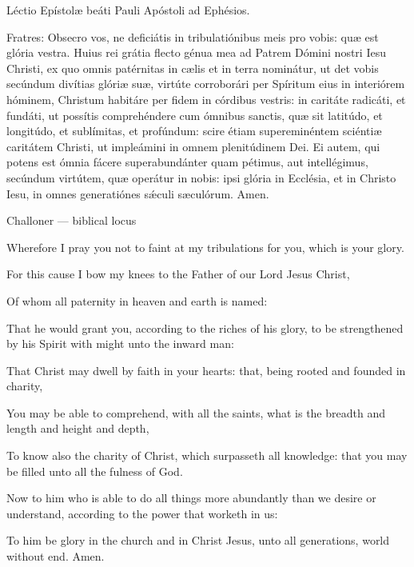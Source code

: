 

Léctio Epístolæ beáti Pauli Apóstoli ad Ephésios.

Fratres: Obsecro vos, ne deficiátis in tribulatiónibus meis pro vobis:
quæ est glória vestra. Huius rei grátia flecto génua mea ad Patrem Dómini
nostri Iesu Christi, ex quo omnis patérnitas in cælis et in terra nominátur,
ut det vobis secúndum divítias glóriæ suæ, virtúte corroborári per Spíritum
eius in interiórem hóminem, Christum habitáre per fidem in córdibus vestris:
in caritáte radicáti, et fundáti, ut possítis comprehéndere cum ómnibus
sanctis, quæ sit latitúdo, et longitúdo, et sublímitas, et profúndum: scire
étiam supereminéntem sciéntiæ caritátem Christi, ut impleámini in omnem
plenitúdinem Dei. Ei autem, qui potens est ómnia fácere superabundánter
quam pétimus, aut intellégimus, secúndum virtútem, quæ operátur in nobis:
ipsi glória in Ecclésia, et in Christo Iesu, in omnes generatiónes sǽculi
sæculórum. Amen.

\finishfulltextelement

\begin{fulltextenglish}{Challoner --- biblical locus}

Wherefore I pray you not to faint at my tribulations for you, which is your glory.

For this cause I bow my knees to the Father of our Lord Jesus Christ,

Of whom all paternity in heaven and earth is named:

That he would grant you, according to the riches of his glory, to be strengthened by his Spirit with might unto the inward man:

That Christ may dwell by faith in your hearts: that, being rooted and founded in charity,

You may be able to comprehend, with all the saints, what is the breadth and length and height and depth,

To know also the charity of Christ, which surpasseth all knowledge: that you may be filled unto all the fulness of God.

Now to him who is able to do all things more abundantly than we desire or understand, according to the power that worketh in us:

To him be glory in the church and in Christ Jesus, unto all generations, world without end. Amen.

\end{fulltextenglish}

